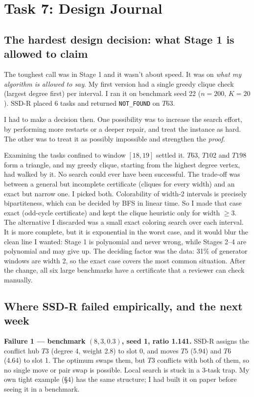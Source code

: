 \section{Task 7: Design Journal}

\subsection{The hardest design decision: what Stage 1 is allowed to claim}
The toughest call was in Stage 1 and it wasn't about speed. It was on
\emph{what my algorithm is allowed to say}. My first version had a single
greedy clique check (largest degree first) per interval. I ran it on
benchmark seed 22 ($n{=}200$, $K{=}20$). SSD-R placed 6 tasks and returned
\texttt{NOT\_FOUND} on $T63$.

I had to make a decision then. One possibility was to increase the search
effort, by performing more restarts or a deeper repair, and treat the
instance as hard. The other was to treat it as possibly impossible and
strengthen the \emph{proof}.

Examining the tasks confined to window $[18,19]$ settled it. $T63$, $T102$
and $T198$ form a triangle, and my greedy clique, starting from the highest
degree vertex, had walked by it. No search could ever have been successful.
The trade-off was between a general but incomplete certificate (cliques for
every width) and an exact but narrow one. I picked both. Colorability of
width-2 intervals is precisely bipartiteness, which can be decided by BFS
in linear time. So I made that case exact (odd-cycle certificate) and kept
the clique heuristic only for width $\ge3$. The alternative I discarded was
a small exact coloring search over each interval. It is more complete, but
it is exponential in the worst case, and it would blur the clean line I
wanted: Stage 1 is polynomial and never wrong, while Stages 2--4 are
polynomial and may give up. The deciding factor was the data: 31\% of
generator windows are width 2, so the exact case covers the most common
situation. After the change, all six large benchmarks have a certificate
that a reviewer can check manually.

\subsection{Where SSD-R failed empirically, and the next week}
\textbf{Failure 1 --- benchmark $(8,3,0.3)$, seed 1, ratio 1.141.} SSD-R
assigns the conflict hub $T3$ (degree 4, weight 2.8) to slot 0, and moves
$T5$ (5.94) and $T6$ (4.64) to slot 1. The optimum swaps them, but $T3$
conflicts with both of them, so no single move or pair swap is possible.
Local search is stuck in a 3-task trap. My own tight example (\S4) has the
same structure; I had built it on paper before seeing it in a benchmark.

